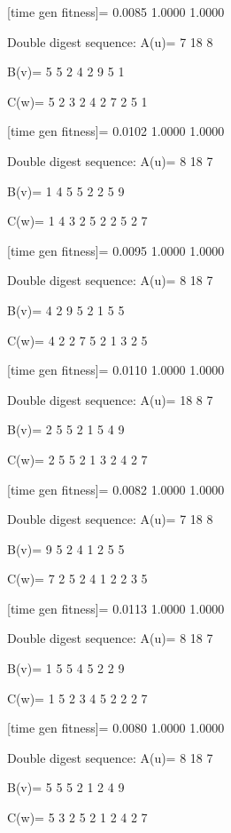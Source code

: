 [time gen fitness]=
    0.0085    1.0000    1.0000

Double digest sequence:
A(u)=
     7    18     8

B(v)=
     5     5     2     4     2     9     5     1

C(w)=
     5     2     3     2     4     2     7     2     5     1

[time gen fitness]=
    0.0102    1.0000    1.0000

Double digest sequence:
A(u)=
     8    18     7

B(v)=
     1     4     5     5     2     2     5     9

C(w)=
     1     4     3     2     5     2     2     5     2     7

[time gen fitness]=
    0.0095    1.0000    1.0000

Double digest sequence:
A(u)=
     8    18     7

B(v)=
     4     2     9     5     2     1     5     5

C(w)=
     4     2     2     7     5     2     1     3     2     5

[time gen fitness]=
    0.0110    1.0000    1.0000

Double digest sequence:
A(u)=
    18     8     7

B(v)=
     2     5     5     2     1     5     4     9

C(w)=
     2     5     5     2     1     3     2     4     2     7

[time gen fitness]=
    0.0082    1.0000    1.0000

Double digest sequence:
A(u)=
     7    18     8

B(v)=
     9     5     2     4     1     2     5     5

C(w)=
     7     2     5     2     4     1     2     2     3     5

[time gen fitness]=
    0.0113    1.0000    1.0000

Double digest sequence:
A(u)=
     8    18     7

B(v)=
     1     5     5     4     5     2     2     9

C(w)=
     1     5     2     3     4     5     2     2     2     7

[time gen fitness]=
    0.0080    1.0000    1.0000

Double digest sequence:
A(u)=
     8    18     7

B(v)=
     5     5     5     2     1     2     4     9

C(w)=
     5     3     2     5     2     1     2     4     2     7

